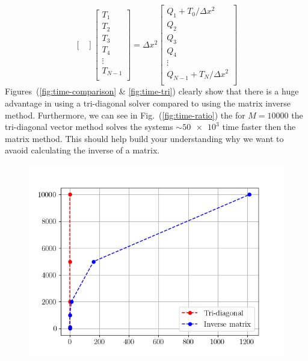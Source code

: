 \begin{mdframed}[style=MyFrame]
\begin{equation}
\begin{bmatrix}
        \end{bmatrix}
        \begin{bmatrix}
            T_{1}       \\
            T_{2}       \\
            T_{3}       \\
            T_{4}       \\
            \vdots      \\
            T_{N-1}     \\
        \end{bmatrix}   
        =
        \Delta x^{2}
        \begin{bmatrix}
            Q_{1} + T_{0}/\Delta x^{2}      \\
            Q_{2}                           \\
            Q_{3}                           \\
            Q_{4}                           \\
            \vdots                          \\
            Q_{N-1} + T_{N}/\Delta x^{2}    \\
        \end{bmatrix}   
    \end{equation}
    Figures~(\ref{fig:time-comparison} \& \ref{fig:time-tri}) clearly show
    that there is a huge advantage in using a tri-diagonal solver compared
    to using the matrix inverse method. Furthermore, we can see in
    Fig.~(\ref{fig:time-ratio}) the for $M=10000$ the tri-diagonal vector
    method solves the systems $\sim \num{50e3}$ time faster then the matrix
    method. This should help build your understanding why we want to avaoid
    calculating the inverse of a matrix.
    \begin{figure}[H]
        \includegraphics[height=0.35\textheight]{../media/time-comparison.png}

\end{figure}
\end{mdframed}
